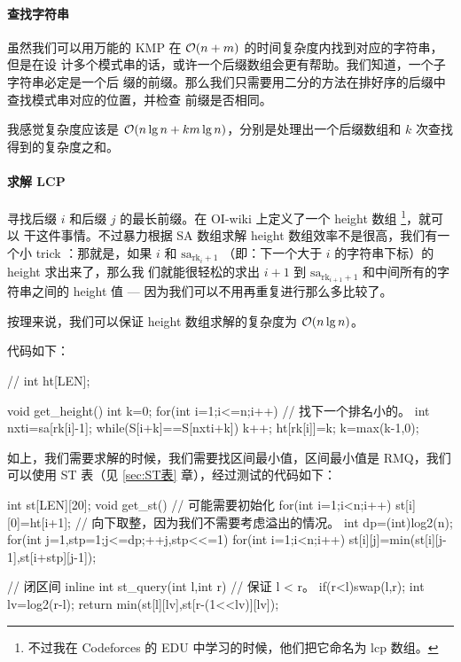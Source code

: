 \paragraph{查找字符串}
虽然我们可以用万能的 KMP 在 $\mathcal{O}(n+m)$ 的时间复杂度内找到对应的字符串，但是在设
计多个模式串的话，或许一个后缀数组会更有帮助。我们知道，一个子字符串必定是一个后
缀的前缀。那么我们只需要用二分的方法在排好序的后缀中查找模式串对应的位置，并检查
前缀是否相同。

我感觉复杂度应该是 $\mathcal{O}(n \lg n + k m \lg n)$，分别是处理出一个后缀数组和 $k$
次查找得到的复杂度之和。

\paragraph{求解 LCP}
寻找后缀 $i$ 和后缀 $j$ 的最长前缀。在 OI-wiki 上定义了一个 height 数组%
\footnote{不过我在 Codeforces 的 EDU 中学习的时候，他们把它命名为 {\ttfamily lcp} 数组。}，就可以
干这件事情。不过暴力根据 SA 数组求解 height 数组效率不是很高，我们有一个小 trick
：那就是，如果 $i$ 和 $\textrm{sa}_{\textrm{rk}_{i} + 1}$ （即：下一个大于 $i$
的字符串下标）的 height 求出来了，那么我
们就能很轻松的求出 $i + 1$ 到 $\textrm{sa}_{\textrm{rk}_{i+1} + 1}$ 和中间所有的字
符串之间的 height 值 --- 因为我们可以不用再重复进行那么多比较了。

按理来说，我们可以保证 height 数组求解的复杂度为 $\mathcal{O}(n \lg n)$。

代码如下：
\begin{Cpp}
// int ht[LEN];

void get_height(){
  int k=0;
  for(int i=1;i<=n;i++){
    // 找下一个排名小的。
    int nxti=sa[rk[i]-1];
    while(S[i+k]==S[nxti+k]) k++;
    ht[rk[i]]=k;
    k=max(k-1,0);
  }
}
\end{Cpp}

如上，我们需要求解的时候，我们需要找区间最小值，区间最小值是 RMQ，我们可以使用
ST 表（见 \ref{sec:ST表} 章），经过测试的代码如下：
\begin{Cpp}
int st[LEN][20];
void get_st(){
  // 可能需要初始化
  for(int i=1;i<n;i++){
    st[i][0]=ht[i+1];
  }
  // 向下取整，因为我们不需要考虑溢出的情况。
  int dp=(int)log2(n);
  for(int j=1,stp=1;j<=dp;++j,stp<<=1){
    for(int i=1;i<n;i++){
      st[i][j]=min(st[i][j-1],st[i+stp][j-1]);
    }
  }
}

// 闭区间
inline int st_query(int l,int r){
  // 保证 l < r。
  if(r<l)swap(l,r);
  int lv=log2(r-l);
  return min(st[l][lv],st[r-(1<<lv)][lv]);
}
\end{Cpp}

